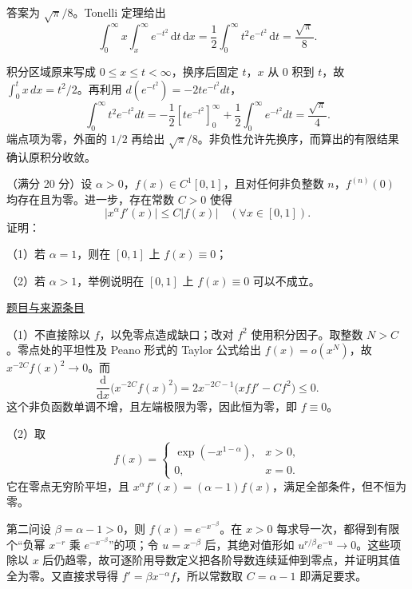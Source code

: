 \documentclass[12pt,fontset=fandol]{ctexart}
\begin{document}
\begin{solve}\label{ans:fin10-hi:3}

答案为 $\sqrt\pi/8$。Tonelli 定理给出
\[
\int_0^\infty x\int_x^\infty e^{-t^2}\,\mathrm dt\,\mathrm dx
=\frac12\int_0^\infty t^2e^{-t^2}\,\mathrm dt=\frac{\sqrt\pi}{8}.
\]

积分区域原来写成 $0\le x\le t<\infty$，换序后固定 $t$，$x$ 从 $0$ 积到 $t$，故 $\int_0^t x\,dx=t^2/2$。再利用 $d(e^{-t^2})=-2te^{-t^2}dt$，
\[
\int_0^\infty t^2e^{-t^2}dt
=-\frac12[te^{-t^2}]_0^\infty+\frac12\int_0^\infty e^{-t^2}dt=\frac{\sqrt\pi}{4}.
\]
端点项为零，外面的 $1/2$ 再给出 $\sqrt\pi/8$。非负性允许先换序，而算出的有限结果确认原积分收敛。

\end{solve}

\begin{example}[来源序号7]\label{ex:fin10-hi:7}\label{pr:fin10-hi:7}

（满分 20 分）设 $\alpha > 0$，$f(x) \in C^{1}[0,1]$，且对任何非负整数 $n$，$f^{(n)}(0)$ 均存在且为零。进一步，存在常数 $C > 0$ 使得
\[
\left| x^{\alpha} f'(x) \right| \leq C | f(x) | \quad (\forall x \in [0,1]).
\]
证明：

（1）若 $\alpha = 1$，则在 $[0,1]$ 上 $f(x) \equiv 0$；

（2）若 $\alpha > 1$，举例说明在 $[0,1]$ 上 $f(x) \equiv 0$ 可以不成立。

\par\href{https://github.com/lzxcr/cmc-mathematics/blob/64916fa1fdbc3e444a652eca204d5669058ee321/src/problems/finals/10/07.md}{题目与来源条目}

\end{example}

\begin{solve}\label{ans:fin10-hi:7}

（1）不直接除以 $f$，以免零点造成缺口；改对 $f^2$ 使用积分因子。取整数 $N>C$。零点处的平坦性及 Peano 形式的 Taylor 公式给出 $f(x)=o(x^N)$，故 $x^{-2C}f(x)^2\to0$。而
\[
\frac{\mathrm d}{\mathrm dx}\bigl(x^{-2C}f(x)^2\bigr)
=2x^{-2C-1}\bigl(xff'-Cf^2\bigr)\leq0.
\]
这个非负函数单调不增，且左端极限为零，因此恒为零，即 $f\equiv0$。

（2）取
\[
f(x)=\begin{cases}\exp(-x^{1-\alpha}),&x>0,\\0,&x=0.\end{cases}
\]
它在零点无穷阶平坦，且 $x^\alpha f'(x)=(\alpha-1)f(x)$，满足全部条件，但不恒为零。

第二问设 $\beta=\alpha-1>0$，则 $f(x)=e^{-x^{-\beta}}$。在 $x>0$ 每求导一次，都得到有限个“负幂 $x^{-r}$ 乘 $e^{-x^{-\beta}}$”的项；令 $u=x^{-\beta}$ 后，其绝对值形如 $u^{r/\beta}e^{-u}\to0$。这些项除以 $x$ 后仍趋零，故可逐阶用导数定义把各阶导数连续延伸到零点，并证明其值全为零。又直接求导得 $f'=\beta x^{-\alpha}f$，所以常数取 $C=\alpha-1$ 即满足要求。

\end{solve}
\end{document}
